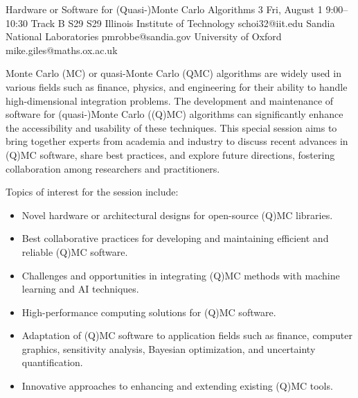 \begin{talk}
  {Hardware or Software for (Quasi-)Monte Carlo Algorithms}%
  {3}%
  {}%
  {}%
  {}%
  {}%
  {Fri, August 1 9:00–10:30 Track B}%
  {S29}%
  {S29}%
  {%
    {Illinois Institute of Technology}%
    {schoi32@iit.edu}}%
  {%
	{Sandia National Laboratories}%
	{pmrobbe@sandia.gov}}%
  {%
	{University of Oxford}%
	{mike.giles@maths.ox.ac.uk}}%

Monte Carlo (MC) or quasi-Monte Carlo (QMC) algorithms are widely used in various fields such as finance, physics, and engineering for their ability to handle high-dimensional integration problems. The development and maintenance of software for (quasi-)Monte Carlo ((Q)MC) algorithms can significantly enhance the accessibility and usability of these techniques. This special session aims to bring together experts from academia and industry to discuss recent advances in (Q)MC software, share best practices, and explore future directions, fostering collaboration among researchers and practitioners.

Topics of interest for the session include:
\begin{itemize}
    \item Novel hardware or architectural designs for open-source (Q)MC libraries.
    \item Best collaborative practices for developing and maintaining efficient and reliable (Q)MC software.
    \item Challenges and opportunities in integrating (Q)MC methods with machine learning and AI techniques.
    \item High-performance computing solutions for (Q)MC software.
    \item Adaptation of (Q)MC software to application fields such as finance, computer graphics, sensitivity analysis, Bayesian optimization, and uncertainty quantification.
    \item Innovative approaches to enhancing and extending existing (Q)MC tools.
\end{itemize}



\end{talk}
